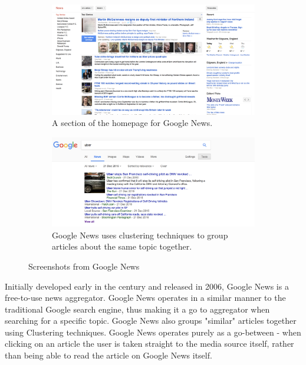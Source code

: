 \documentclass[12pt]{article}
\begin{document}
\begin{figure}[H]
  \centering
  \begin{subfigure}{0.8\textwidth}
        \includegraphics[width=\textwidth]{GoogleHome}
        \caption[Screenshot from the Google News home page]{A section of the homepage for Google News.\cite{googleNews}}
        \label{GoogleNewsHome}
    \end{subfigure}
    
    \begin{subfigure}{\textwidth}
    \includegraphics[width=\textwidth]{GoogleUber}
   \caption[Screenshots from a Google News search]{Google News uses clustering techniques to group articles about the same topic together. }
   \label{GoogleNewsUber}
   \end{subfigure}
   \caption[Screenshots from Google News]{Screenshots from Google News}
\end{figure}

Initially developed early in the century and released in 2006, Google News\cite{googleNews} is a free-to-use news aggregator. Google News operates in a similar manner to the traditional Google\cite{google} search engine, thus making it a go to aggregator when searching for a specific topic. Google News also groups "similar" articles together using Clustering techniques\cite{googleClustering}. Google News operates purely as a go-between - when clicking on an article the user is taken straight to the media source itself, rather than being able to read the article on Google News itself. 
\end{document}
